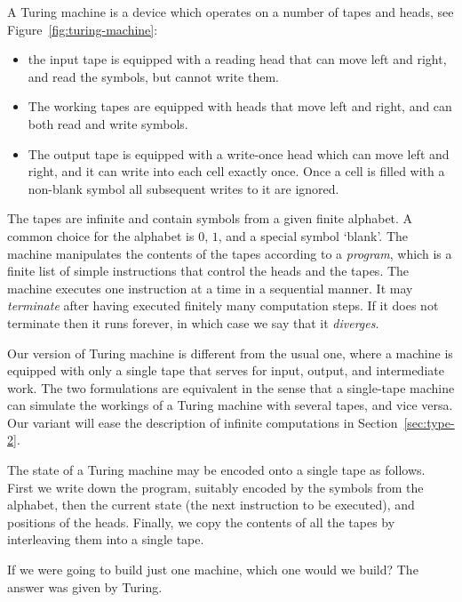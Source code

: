 A Turing machine is a device which operates on a number of tapes and
heads, see Figure~\ref{fig:turing-machine}:
%
\begin{itemize}
\item the input tape is equipped with a reading head that can move
  left and right, and read the symbols, but cannot write them.
\item The working tapes are equipped with heads that move left and
  right, and can both read and write symbols.
\item The output tape is equipped with a write-once head which can
  move left and right, and it can write into each cell exactly once.
  Once a cell is filled with a non-blank symbol all subsequent writes
  to it are ignored.
\end{itemize}
%
The tapes are infinite and contain
symbols from a given finite alphabet. A common choice for the alphabet
is $0$, $1$, and a special symbol `blank'. The machine manipulates the
contents of the tapes according to a \emph{program}, which is a finite
list of simple instructions that control the heads and the tapes. The
machine executes one instruction at a time in a sequential manner. It
may \emph{terminate} after having executed finitely many computation
steps. If it does not terminate then it runs forever, in which case we
say that it \emph{diverges}.

Our version of Turing machine is different from the usual one, where a
machine is equipped with only a single tape that serves for input,
output, and intermediate work. The two formulations are equivalent in
the sense that a single-tape machine can simulate the workings of a
Turing machine with several tapes, and vice versa. Our variant will
ease the description of infinite computations in
Section~\ref{sec:type-2}.

The state of a Turing machine may be encoded onto a single tape as
follows. First we write down the program, suitably encoded by the
symbols from the alphabet, then the current state (the next
instruction to be executed), and positions of the heads. Finally, we
copy the contents of all the tapes by interleaving them into a single
tape.

If we were going to build just one machine, which one would we build?
The answer was given by Turing.

